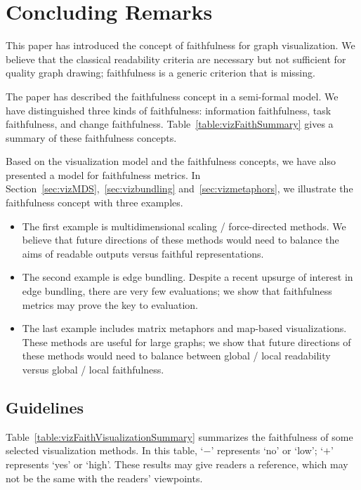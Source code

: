 \documentclass[10pt,journal,cspaper,compsoc]{IEEEtran}
\begin{document}
\section{Concluding Remarks\label{sec:vizconclusion} }

This paper has introduced the concept of faithfulness
for graph visualization. We believe that the classical
readability criteria are necessary but not sufficient
for quality graph drawing; faithfulness is a generic
criterion that is missing. 

The paper has described the
faithfulness concept in a semi-formal model.
We have distinguished three kinds of faithfulness: information faithfulness, task faithfulness, and change faithfulness.
Table~\ref{table:vizFaithSummary} gives a summary of these faithfulness concepts.


Based on the visualization model and the faithfulness concepts, we have also presented a model for faithfulness metrics. 
In Section~\ref{sec:vizMDS},~\ref{sec:vizbundling} and~\ref{sec:vizmetaphors}, we
illustrate the faithfulness concept with three examples.
\begin{itemize}
\item The first example is multidimensional scaling / force-directed methods. We believe that future directions
of these methods would need to balance the aims of
readable outputs versus faithful representations. 

\item The
second example is edge bundling. Despite a recent
upsurge of interest in edge bundling, there are very
few evaluations; we show that faithfulness metrics
may prove the key to evaluation. 

\item The last example
includes matrix metaphors and map-based visualizations. These methods are useful for large graphs; we
show that future directions of these methods would
need to balance between global / local readability
versus global / local faithfulness.
\end{itemize}




\subsection{Guidelines}
Table~\ref{table:vizFaithVisualizationSummary} summarizes the faithfulness of some selected visualization methods. In this table, `$-$' represents `no' or `low'; `$+$' represents `yes' or `high'. These results may give readers a reference, which may not be the same with the readers' viewpoints. 
\end{document}

